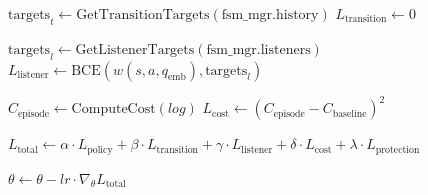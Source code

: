 \documentclass[11pt,a4paper]{article}
\begin{document}
\begin{algorithm}[htbp]
{{{            $\text{targets}_t \leftarrow \text{GetTransitionTargets}(\text{fsm\_mgr}.\text{history})$\;
            $L_{\text{transition}} \leftarrow 0$\;
            
            $\text{targets}_l \leftarrow \text{GetListenerTargets}(\text{fsm\_mgr}.\text{listeners})$\;
            $L_{\text{listener}} \leftarrow \text{BCE}(w(s, a, q_{\text{emb}}), \text{targets}_l)$\;
            
            $C_{\text{episode}} \leftarrow \text{ComputeCost}(log)$\;
            $L_{\text{cost}} \leftarrow (C_{\text{episode}} - C_{\text{baseline}})^2$\;
            
            
            $L_{\text{total}} \leftarrow \alpha \cdot L_{\text{policy}} + \beta \cdot L_{\text{transition}} + \gamma \cdot L_{\text{listener}} + \delta \cdot L_{\text{cost}} + \lambda \cdot L_{\text{protection}}$\;
            
            $\theta \leftarrow \theta - lr \cdot \nabla_\theta L_{\text{total}}$\;
        }
    }
}

\end{algorithm}
\end{document}
